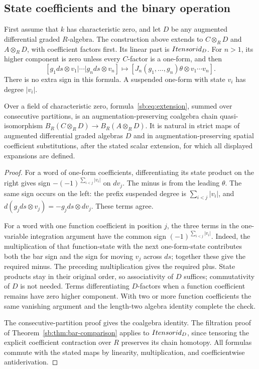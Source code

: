 \subsection{State coefficients and the binary operation}

First assume that \(k\) has characteristic zero, and let \(D\)
be any augmented differential graded \(R\)-algebra.
The construction above extends to \(C\otimes_R D\) and
\(A\otimes_R D\), with coefficient factors first.  Its linear
part is \(Itensorid_D\).  For \(n>1\), its higher
component is zero unless every \(C\)-factor is a one-form, and then
\begin{equation}\label{sb:eq:extension}
 [g_1ds\otimes v_1|\cdots|g_nds\otimes v_n]
 \longmapsto
 [J_n(g_1,\ldots,g_n)\theta\otimes v_1\cdots v_n].
\end{equation}
There is no extra sign in this formula.  A suspended one-form with
state \(v_i\) has degree \(|v_i|\).

\begin{lemma}\label{sb:lem:state-extension}
Over a field of characteristic zero, formula~\eqref{sb:eq:extension},
summed over consecutive partitions,
is an augmentation-preserving coalgebra chain quasi-isomorphism
\(B_R(C\otimes_R D)\to B_R(A\otimes_R D)\).
It is natural in strict maps of augmented differential graded algebras
\(D\) and in augmentation-preserving spatial coefficient substitutions,
after the stated scalar extension, for which all displayed expansions
are defined.
\end{lemma}

\begin{proof}
For a word of one-form coefficients, differentiating its state product
on the right gives sign \(-(-1)^{\sum_{i<j}|v_i|}\) on
\(dv_j\).  The minus is from the leading \(\theta\).
The same sign occurs on the left: the prefix suspended degree is
\(\sum_{i<j}|v_i|\), and
\(d(g_jds\otimes v_j)=-g_jds\otimes dv_j\).
These terms agree.

For a word with one function coefficient in position \(j\),
the three terms in the one-variable integration argument have the
common sign \((-1)^{\sum_{i<j}|v_i|}\).
Indeed, the multiplication of that function-state with the next
one-form-state contributes both the bar sign and the sign for moving
\(v_j\) across \(ds\); together these give the required minus.
The preceding multiplication gives the required plus.  State products
stay in their original order, so associativity of \(D\) suffices;
commutativity of \(D\) is not needed.  Terms differentiating
\(D\)-factors when a function coefficient remains have zero higher
component.  With two or more function coefficients the same vanishing
argument and the length-two algebra identity complete the check.

The consecutive-partition proof gives the coalgebra identity.
The filtration proof of Theorem~\ref{sb:thm:bar-comparison} applies
to \(Itensorid_D\), since tensoring the explicit coefficient
contraction over \(R\) preserves its chain homotopy.
All formulas commute with the stated maps by linearity, multiplication,
and coefficientwise antiderivation.
\end{proof}

